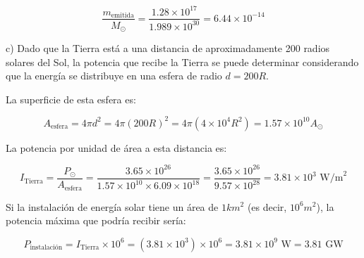 \documentclass{elsarticle}
\begin{document}
\[
\frac{m_{\text{emitida}}}{M_{\odot}} = \frac{1.28 \times 10^{17}}{1.989 \times 10^{30}} = 6.44 \times 10^{-14}
\]

c) Dado que la Tierra está a una distancia de aproximadamente 200 radios solares del Sol, la potencia que recibe la Tierra se puede determinar considerando que la energía se distribuye en una esfera de radio \( d = 200 R \).  

La superficie de esta esfera es:

\[
A_{\text{esfera}} = 4\pi d^2 = 4\pi (200 R)^2 = 4\pi (4 \times 10^4 R^2) = 1.57 \times 10^{10} A_{\odot}
\]

La potencia por unidad de área a esta distancia es:

\[
I_{\text{Tierra}} = \frac{P_{\odot}}{A_{\text{esfera}}} = \frac{3.65 \times 10^{26}}{1.57 \times 10^{10} \times 6.09 \times 10^{18}} = \frac{3.65 \times 10^{26}}{9.57 \times 10^{28}} = 3.81 \times 10^3 \text{ W/m}^2
\]

Si la instalación de energía solar tiene un área de \( 1km^2 \) (es decir, \( 10^6 m^2\)), la potencia máxima que podría recibir sería:

\[
P_{\text{instalación}} = I_{\text{Tierra}} \times 10^6 = (3.81 \times 10^3) \times 10^6 = 3.81 \times 10^9 \text{ W} = 3.81 \text{ GW}
\]
\end{document}
